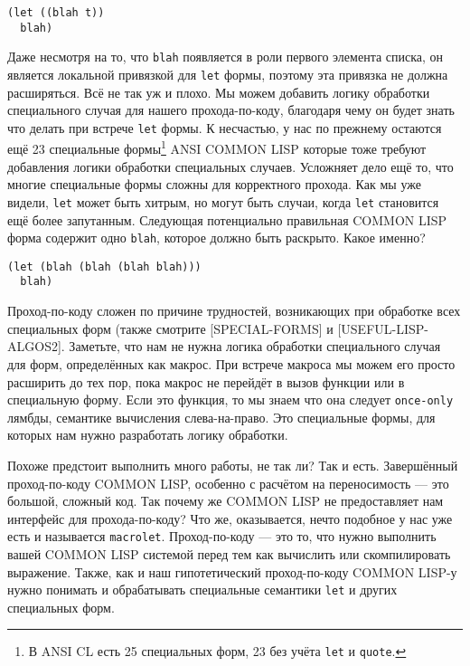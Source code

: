 \begin{verbatim}
(let ((blah t))
  blah)
\end{verbatim}

Даже несмотря на то, что \verb"blah" появляется в роли первого элемента списка, он является локальной привязкой для \verb"let" формы, поэтому эта привязка не должна расширяться. Всё не так уж и плохо. Мы можем добавить логику обработки специального случая для нашего прохода-по-коду, благодаря чему он будет знать что делать при встрече \verb"let" формы. К несчастью, у нас по прежнему остаются ещё 23 специальные формы\footnote{В ANSI CL есть 25 специальных форм, 23 без учёта \verb"let" и \verb"quote".} ANSI COMMON LISP которые тоже требуют добавления логики обработки специальных случаев. Усложняет дело ещё то, что многие специальные формы сложны для корректного прохода. Как мы уже видели, \verb"let" может быть хитрым, но могут быть случаи, когда \verb"let" становится ещё более запутанным. Следующая потенциально правильная COMMON LISP форма содержит одно \verb"blah", которое должно быть раскрыто. Какое именно?



\begin{verbatim}
(let (blah (blah (blah blah)))
  blah)
\end{verbatim}

Проход-по-коду сложен по причине трудностей, возникающих при обработке всех специальных форм (также смотрите [SPECIAL-FORMS] и [USEFUL-LISP-ALGOS2]. Заметьте, что нам не нужна логика обработки специального случая для форм, определённых как макрос. При встрече макроса мы можем его просто расширить до тех пор, пока макрос не перейдёт в вызов функции или в специальную форму. Если это функция, то мы знаем что она следует \verb"once-only" лямбды, семантике вычисления слева-на-право. Это специальные формы, для которых нам нужно разработать логику обработки.

Похоже предстоит выполнить много работы, не так ли? Так и есть. Завершённый проход-по-коду COMMON LISP, особенно с расчётом на переносимость --- это большой, сложный код. Так почему же COMMON LISP не предоставляет нам интерфейс для прохода-по-коду? Что же, оказывается, нечто подобное у нас уже есть и называется \verb"macrolet". Проход-по-коду --- это то, что нужно выполнить вашей COMMON LISP системой перед тем как вычислить или скомпилировать выражение. Также, как и наш гипотетический проход-по-коду COMMON LISP-у нужно понимать и обрабатывать специальные семантики \verb"let" и других специальных форм.

